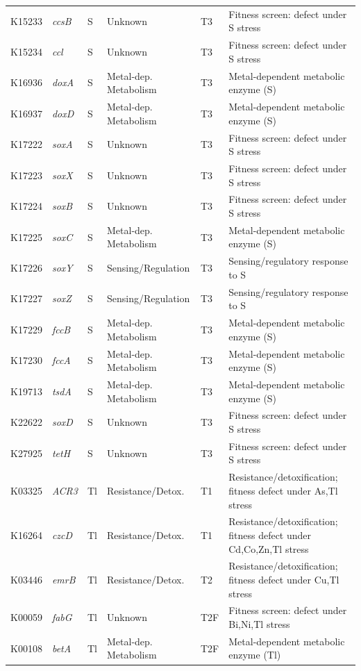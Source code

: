\documentclass[11pt]{article}
\begin{document}
\begin{longtable}{lllllp{4.8cm}}
K15233 & \textit{ccsB} & S & Unknown & T3 & Fitness screen: defect under S stress \\
K15234 & \textit{ccl} & S & Unknown & T3 & Fitness screen: defect under S stress \\
K16936 & \textit{doxA} & S & Metal-dep. Metabolism & T3 & Metal-dependent metabolic enzyme (S) \\
K16937 & \textit{doxD} & S & Metal-dep. Metabolism & T3 & Metal-dependent metabolic enzyme (S) \\
K17222 & \textit{soxA} & S & Unknown & T3 & Fitness screen: defect under S stress \\
K17223 & \textit{soxX} & S & Unknown & T3 & Fitness screen: defect under S stress \\
K17224 & \textit{soxB} & S & Unknown & T3 & Fitness screen: defect under S stress \\
K17225 & \textit{soxC} & S & Metal-dep. Metabolism & T3 & Metal-dependent metabolic enzyme (S) \\
K17226 & \textit{soxY} & S & Sensing/Regulation & T3 & Sensing/regulatory response to S \\
K17227 & \textit{soxZ} & S & Sensing/Regulation & T3 & Sensing/regulatory response to S \\
K17229 & \textit{fccB} & S & Metal-dep. Metabolism & T3 & Metal-dependent metabolic enzyme (S) \\
K17230 & \textit{fccA} & S & Metal-dep. Metabolism & T3 & Metal-dependent metabolic enzyme (S) \\
K19713 & \textit{tsdA} & S & Metal-dep. Metabolism & T3 & Metal-dependent metabolic enzyme (S) \\
K22622 & \textit{soxD} & S & Unknown & T3 & Fitness screen: defect under S stress \\
K27925 & \textit{tetH} & S & Unknown & T3 & Fitness screen: defect under S stress \\
K03325 & \textit{ACR3} & Tl & Resistance/Detox. & T1 & Resistance/detoxification; fitness defect under As,Tl stress \\
K16264 & \textit{czcD} & Tl & Resistance/Detox. & T1 & Resistance/detoxification; fitness defect under Cd,Co,Zn,Tl stress \\
K03446 & \textit{emrB} & Tl & Resistance/Detox. & T2 & Resistance/detoxification; fitness defect under Cu,Tl stress \\
K00059 & \textit{fabG} & Tl & Unknown & T2F & Fitness screen: defect under Bi,Ni,Tl stress \\
K00108 & \textit{betA} & Tl & Metal-dep. Metabolism & T2F & Metal-dependent metabolic enzyme (Tl) \\

\end{longtable}
\end{document}

